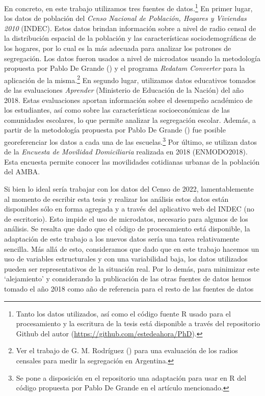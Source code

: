 \documentclass[
  spanish,
  a4paper,%
  chapterprefix=true,%
  DIV=calc,%
  twoside]{scrbook}%
\begin{document}
En concreto, en este trabajo utilizamos tres fuentes de
datos.\footnote{Tanto los datos utilizados, así como el código fuente R
  usado para el procesamiento y la escritura de la tesis está
  disponible a través del repositorio Github del autor
  (\href{https://github.com/estedeahora/phd}{https://github.com/estedeahora/}\href{https://github.com/estedeahora/PhD}{PhD}).} En primer lugar, los datos de población del \emph{Censo
Nacional de Población, Hogares y Viviendas 2010} (INDEC). Estos datos
brindan información sobre a nivel de radio censal de la distribución
espacial de la población y las características sociodemográficas de los
hogares, por lo cual es la más adecuada para analizar los patrones de
segregación. Los datos fueron usados a nivel de microdatos usando la
metodología propuesta por Pablo De Grande () y el programa
\emph{Redatam Converter} para la aplicación de la misma.\footnote{Ver el trabajo de G. M. Rodríguez () para una evaluación
  de los radios censales para medir la segregación en Argentina.} En
segundo lugar, utilizamos datos educativos tomados de las evaluaciones
\emph{Aprender} (Ministerio de Educación de la Nación) del año 2018. Estas
evaluaciones aportan información sobre el desempeño académico de los
estudiantes, así como sobre las características socioeconómicas de las
comunidades escolares, lo que permite analizar la segregación escolar.
Además, a partir de la metodología propuesta por Pablo De Grande
() fue posible georeferenciar los datos a cada una de las
escuelas.\footnote{Se pone a disposición en el repositorio una adaptación
  para usar en R del código propuesta por Pablo De Grande en el
  artículo mencionado.} Por último, se utilizan datos de la \emph{Encuesta
de Movilidad Domiciliaria} realizada en 2018 (ENMODO2018). Esta encuesta
permite conocer las movilidades cotidianas urbanas de la población del
AMBA.

Si bien lo ideal sería trabajar con los datos del Censo de 2022,
lamentablemente al momento de escribir esta tesis y realizar los
análisis estos datos están disponibles sólo en forma agregada y a través
del aplicativo web del INDEC (no de escritorio). Esto impide el uso de
microdatos, necesario para algunos de los análisis. Se resalta que dado
que el código de procesamiento está disponible, la adaptación de este
trabajo a los nuevos datos sería una tarea relativamente sencilla. Más
allá de esto, consideramos que dado que en este trabajo hacemos un uso
de variables estructurales y con una variabilidad baja, los datos
utilizados pueden ser representativos de la situación real. Por lo
demás, para minimizar este `alejamiento' y considerando la publicación
de las otras fuentes de datos hemos tomado el año 2018 como año de
referencia para el resto de las fuentes de datos
\end{document}
